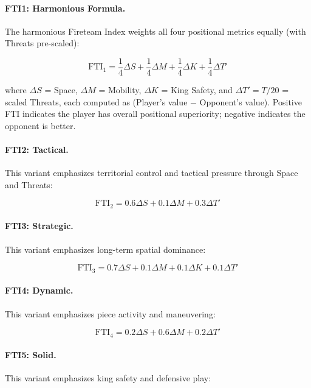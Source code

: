 \documentclass[11pt]{book}
\begin{document}
\paragraph{FTI1: Harmonious Formula.} The harmonious Fireteam Index weights all four positional metrics equally (with Threats pre-scaled):

\begin{equation}
\text{FTI}_1 = \frac{1}{4} \Delta S + \frac{1}{4} \Delta M + \frac{1}{4} \Delta K + \frac{1}{4} \Delta T'
\end{equation}

where $\Delta S$ = Space, $\Delta M$ = Mobility, $\Delta K$ = King Safety, and $\Delta T' = T/20$ = scaled Threats, each computed as (Player's value $-$ Opponent's value). Positive FTI indicates the player has overall positional superiority; negative indicates the opponent is better.

\paragraph{FTI2: Tactical.} This variant emphasizes territorial control and tactical pressure through Space and Threats:

\begin{equation}
\text{FTI}_2 = 0.6 \Delta S + 0.1 \Delta M + 0.3 \Delta T'
\end{equation}

\paragraph{FTI3: Strategic.} This variant emphasizes long-term spatial dominance:

\begin{equation}
\text{FTI}_3 = 0.7 \Delta S + 0.1 \Delta M + 0.1 \Delta K + 0.1 \Delta T'
\end{equation}

\paragraph{FTI4: Dynamic.} This variant emphasizes piece activity and maneuvering:

\begin{equation}
\text{FTI}_4 = 0.2 \Delta S + 0.6 \Delta M + 0.2 \Delta T'
\end{equation}

\paragraph{FTI5: Solid.} This variant emphasizes king safety and defensive play:
\end{document}
